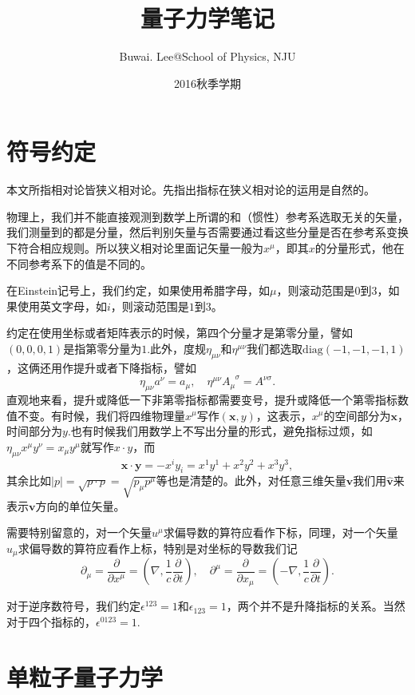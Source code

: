 \documentclass[9pt]{extbook}
\begin{document}
\title{量子力学笔记}
\author{Buwai. Lee@School of Physics, NJU}
\date{2016秋季学期}
\maketitle %
\frontmatter
\tableofcontents
\chapter*{符号约定}
本文所指相对论皆狭义相对论。先指出指标在狭义相对论的运用是自然的。

物理上，我们并不能直接观测到数学上所谓的和（惯性）参考系选取无关的矢量，我们测量到的都是分量，然后判别矢量与否需要通过看这些分量是否在参考系变换下符合相应规则。所以狭义相对论里面记矢量一般为$x^\mu$，即其$x$的分量形式，他在不同参考系下的值是不同的。

在Einstein记号上，我们约定，如果使用希腊字母，如$\mu$，则滚动范围是$0$到$3$，如果使用英文字母，如$i$，则滚动范围是$1$到$3$。

约定在使用坐标或者矩阵表示的时候，第四个分量才是第零分量，譬如$(0,0,0,1)$是指第零分量为$1$.此外，度规$\eta_{\mu\nu}$和$\eta^{\mu\nu}$我们都选取$\mathrm{diag}(-1,-1,-1,1)$，这俩还用作提升或者下降指标，譬如
\[
\eta_{\mu\nu}a^\nu=a_\mu,\quad \eta^{\mu\nu}A_\mu^{\phantom{\mu}\sigma}=A^{\nu\sigma}.
\]
直观地来看，提升或降低一下非第零指标都需要变号，提升或降低一个第零指标数值不变。有时候，我们将四维物理量$x^\mu$写作$(\bm{x},y)$，这表示，$x^\mu$的空间部分为$\bm{x}$，时间部分为$y$.也有时候我们用数学上不写出分量的形式，避免指标过烦，如$\eta_{\mu\nu}x^\mu y^\nu=x_\mu y^\mu$就写作$x\cdot y$，而\[\bm{x}\cdot \bm{y}=-x^i y_i=x^1y^1+x^2y^2+x^3y^3,\]
其余比如$|p|=\sqrt{p\cdot p}=\sqrt{p_\mu p^\mu}$等也是清楚的。此外，对任意三维矢量$\bm{v}$我们用$\hat{\bm{v}}$来表示$\bm{v}$方向的单位矢量。

需要特别留意的，对一个矢量$u^\mu$求偏导数的算符应看作下标，同理，对一个矢量$u_\mu$求偏导数的算符应看作上标，特别是对坐标的导数我们记
\[
	\partial_\mu=\frac{\partial}{\partial x^\mu}=\left(\nabla,\frac{1}{c} \frac{\partial}{\partial t}\right),\quad \partial^\mu=\frac{\partial}{\partial x_\mu}=\left(-\nabla,\frac{1}{c} \frac{\partial}{\partial t}\right).
\]

对于逆序数符号，我们约定$\epsilon^{123}=1$和$\epsilon_{123}=1$，两个并不是升降指标的关系。当然对于四个指标的，$\epsilon^{0123}=1$.

\mainmatter
\chapter{单粒子量子力学}
\end{document}
